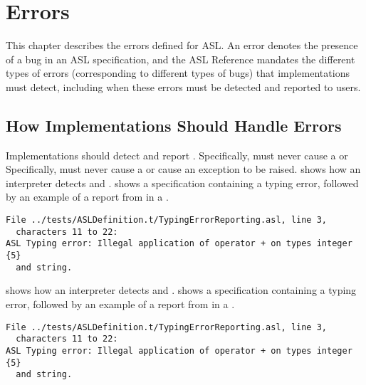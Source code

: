 \chapter{Errors\label{chap:Errors}}

This chapter describes the errors defined for ASL.
%
An error denotes the presence of a bug in an ASL specification,
and the ASL Reference mandates the different types of errors
(corresponding to different types of bugs) that implementations must detect,
including when these errors must be detected and reported to users.

\section{How Implementations Should Handle Errors}

 Implementations should detect and report \staticerrorsterm.
Specifically, \staticerrorsterm{} must never cause a \dynamicerrorterm{} or
Specifically, \staticerrorsterm{} must never cause a \dynamicerrorterm{} or
cause an exception to be raised.
%
 shows how an interpreter detects \builderrorsterm{}
and \typingerrorsterm{}.
%
 shows a specification containing a typing error,
followed by an example of a report from \aslref{} in a \linuxbashshell.

\begin{Verbatim}[fontsize=\footnotesize, frame=single]
File ../tests/ASLDefinition.t/TypingErrorReporting.asl, line 3,
  characters 11 to 22:
ASL Typing error: Illegal application of operator + on types integer {5}
  and string.
\end{Verbatim}
%
 shows how an interpreter detects \builderrorsterm{}
and \typingerrorsterm{}.
%
 shows a specification containing a typing error,
followed by an example of a report from \aslref{} in a \linuxbashshell.

\begin{Verbatim}[fontsize=\footnotesize, frame=single]
File ../tests/ASLDefinition.t/TypingErrorReporting.asl, line 3,
  characters 11 to 22:
ASL Typing error: Illegal application of operator + on types integer {5}
  and string.
\end{Verbatim}

